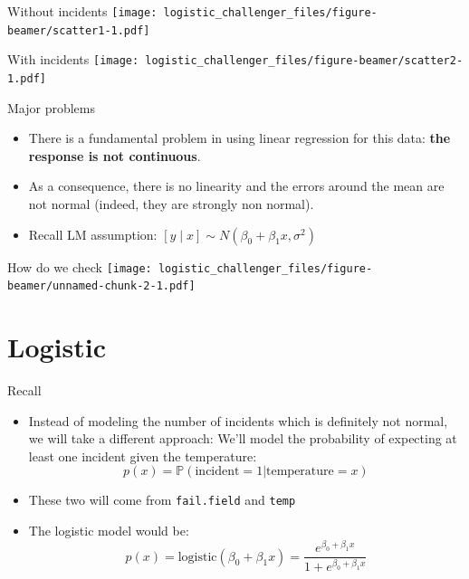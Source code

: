 \documentclass[
  ignorenonframetext,
]{beamer}
\begin{document}
\begin{frame}{Without incidents}
\protect\hypertarget{without-incidents}{}
\texttt{[image: logistic\_challenger\_files/figure-beamer/scatter1-1.pdf]}
\end{frame}

\begin{frame}{With incidents}
\protect\hypertarget{with-incidents}{}
\texttt{[image: logistic\_challenger\_files/figure-beamer/scatter2-1.pdf]}
\end{frame}

\begin{frame}{Major problems}
\protect\hypertarget{major-problems}{}
\begin{itemize}
\item
  There is a fundamental problem in using linear regression for this
  data: \textbf{the response is not continuous}.
\item
  As a consequence, there is no linearity and the errors around the mean
  are not normal (indeed, they are strongly non normal).
\item
  Recall LM assumption:
  \([ y \mid x] \sim N(\beta_0 + \beta_1 x, \sigma^2)\)
\end{itemize}
\end{frame}

\begin{frame}{How do we check}
\protect\hypertarget{how-do-we-check}{}
\texttt{[image: logistic\_challenger\_files/figure-beamer/unnamed-chunk-2-1.pdf]}
\end{frame}

\hypertarget{logistic}{%
\section{Logistic}\label{logistic}}

\begin{frame}[fragile]{Recall}
\protect\hypertarget{recall}{}
\begin{itemize}
\item
  Instead of modeling the number of incidents which is definitely not
  normal, we will take a different approach: We'll model the probability
  of expecting at least one incident given the temperature: \[
  p(x) = \mathbb{P}(\text{incident} = 1 | \text{temperature} = x)
  \]
\item
  These two will come from \texttt{fail.field} and \texttt{temp}
\item
  The logistic model would be: \[
  p(x) = \text{logistic}(\beta_0 + \beta_1x) = \frac{e^{\beta_0 + \beta_1x}}{1 + e^{\beta_0 + \beta_1x}}
  \]
\end{itemize}
\end{frame}
\end{document}

